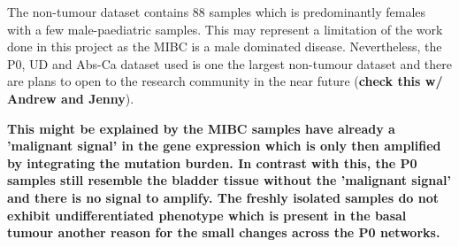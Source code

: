 The non-tumour dataset contains 88 samples which is predominantly females with a few male-paediatric samples. This may represent a limitation of the work done in this project as the MIBC is a male dominated disease. Nevertheless, the P0, UD and Abs-Ca dataset used is one the largest non-tumour dataset and there are plans to open to the research community in the near future (\textbf{check this w/ Andrew and Jenny}).


\textbf{This might be explained by the MIBC samples have already a 'malignant signal' in the gene expression which is only then amplified by integrating the mutation burden. In contrast with this, the P0 samples still resemble the bladder tissue without the 'malignant signal' and there is no signal to amplify. The freshly isolated samples do not exhibit undifferentiated phenotype which is present in the basal tumour another reason for the small changes across the P0 networks.}

